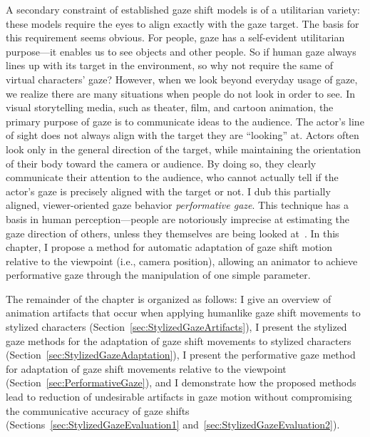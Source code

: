 A secondary constraint of established gaze shift models is of a utilitarian variety: these models require the eyes to align exactly with the gaze target. The basis for this requirement seems obvious. For people, gaze has a self-evident utilitarian purpose---it enables us to see objects and other people. So if human gaze always lines up with its target in the environment, so why not require the same of virtual characters' gaze?
However, when we look beyond everyday usage of gaze, we realize there are many situations when people do not look in order to see.
In visual storytelling media, such as theater, film, and cartoon animation, the primary purpose of gaze is to communicate ideas to the audience. The actor's line of sight does not always align with the target they are ``looking'' at. Actors often look only in the general direction of the target, while maintaining the orientation of their body toward the camera or audience. By doing so, they clearly communicate their attention to the audience, who cannot actually tell if the actor's gaze is precisely aligned with the target or not.
I dub this partially aligned, viewer-oriented gaze behavior \emph{performative gaze}. This technique has a basis in human perception---people are notoriously imprecise at estimating the gaze direction of others, unless they themselves are being looked at~\citep{argyle1976gaze}. In this chapter, I propose a method for automatic adaptation of gaze shift motion relative to the viewpoint (i.e., camera position), allowing an animator to achieve performative gaze through the manipulation of one simple parameter.

The remainder of the chapter is organized as follows: I give an overview of animation artifacts that occur when applying humanlike gaze shift movements to stylized characters (Section~\ref{sec:StylizedGazeArtifacts}), I present the stylized gaze methods for the adaptation of gaze shift movements to stylized characters (Section~\ref{sec:StylizedGazeAdaptation}), I present the performative gaze method for adaptation of gaze shift movements relative to the viewpoint (Section~\ref{sec:PerformativeGaze}), and I demonstrate how the proposed methods lead to reduction of undesirable artifacts in gaze motion without compromising the communicative accuracy of gaze shifts (Sections~\ref{sec:StylizedGazeEvaluation1} and~\ref{sec:StylizedGazeEvaluation2}). 